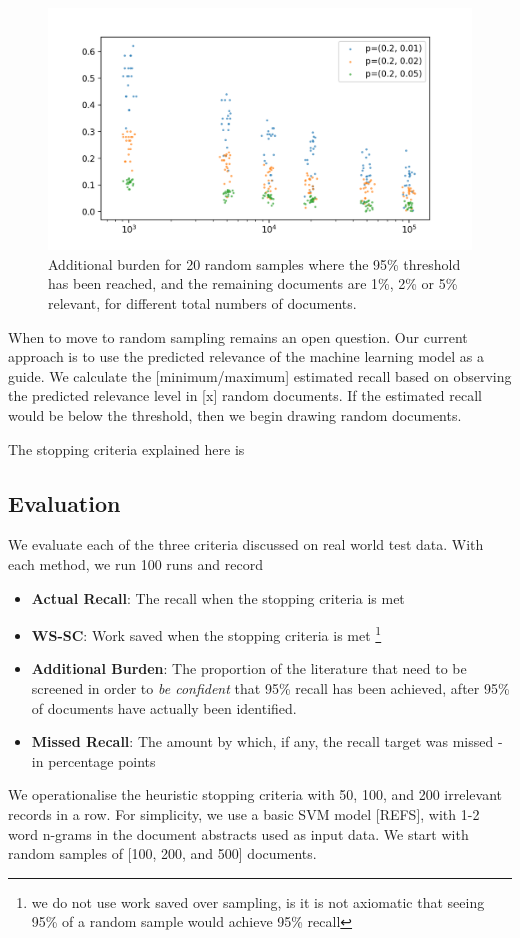 \documentclass{bmcart}
\begin{document}
	\begin{figure}
		\includegraphics[width=\linewidth]{../images/additional_burden}
		\caption{Additional burden for 20 random samples where the 95\% threshold has been reached, and the remaining documents are 1\%, 2\% or 5\% relevant, for different total numbers of documents.}
		\label{additional-burden}
	\end{figure}

	When to move to random sampling remains an open question. Our current approach is to use the predicted relevance of the machine learning model as a guide. We calculate the [minimum/maximum] estimated recall based on observing the predicted relevance level in [x] random documents. If the estimated recall would be below the threshold, then we begin drawing random documents.

	The stopping criteria explained here is 
	
	\subsection*{Evaluation}
	
	We evaluate each of the three criteria discussed on real world test data. With each method, we run 100 runs and record 
	\begin{itemize}
		\item \textbf{Actual Recall}: The recall when the stopping criteria is met
		\item \textbf{WS-SC}: Work saved when the stopping criteria is met \footnote{we do not use work saved over sampling, is it is not axiomatic that seeing 95\% of a random sample would achieve 95\% recall}
		\item \textbf{Additional Burden}: The proportion of the literature that need to be screened in order to \textit{be confident} that 95\% recall has been achieved, after 95\% of documents have actually been identified.
		\item \textbf{Missed Recall}: The amount by which, if any, the recall target was missed - in percentage points
	\end{itemize}
	We operationalise the heuristic stopping criteria with 50, 100, and 200 irrelevant records in a row. For simplicity, we use a basic SVM model [REFS], with 1-2 word n-grams in the document abstracts used as input data. We start with random samples of [100, 200, and 500] documents.
	
\end{document}
